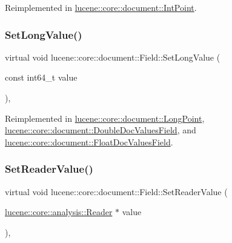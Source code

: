 Reimplemented in \mbox{\hyperlink{classlucene_1_1core_1_1document_1_1IntPoint_a49cd2286ec4ffa46d868eea812d85234}{lucene\+::core\+::document\+::\+Int\+Point}}.

\mbox{\label{classlucene_1_1core_1_1document_1_1Field_a949822599f392fb7fca20423902e535a}} 
\subsubsection{\texorpdfstring{Set\+Long\+Value()}{SetLongValue()}}
{\footnotesize\ttfamily virtual void lucene\+::core\+::document\+::\+Field\+::\+Set\+Long\+Value (\begin{DoxyParamCaption}\item[{const int64\+\_\+t}]{value }\end{DoxyParamCaption})\hspace{0.3cm}{\ttfamily [inline]}, {\ttfamily [virtual]}}



Reimplemented in \mbox{\hyperlink{classlucene_1_1core_1_1document_1_1LongPoint_a5bc668dfdf190b8bc0a52808a6580b40}{lucene\+::core\+::document\+::\+Long\+Point}}, \mbox{\hyperlink{classlucene_1_1core_1_1document_1_1DoubleDocValuesField_ab51b275ef2d23c248e945f4747a6dd6e}{lucene\+::core\+::document\+::\+Double\+Doc\+Values\+Field}}, and \mbox{\hyperlink{classlucene_1_1core_1_1document_1_1FloatDocValuesField_a27b6b009471cbaa1b0baf8facb97fa6d}{lucene\+::core\+::document\+::\+Float\+Doc\+Values\+Field}}.

\mbox{\label{classlucene_1_1core_1_1document_1_1Field_a86a255eb3b09b70fe76af3b7d75364e5}} 
\subsubsection{\texorpdfstring{Set\+Reader\+Value()}{SetReaderValue()}}
{\footnotesize\ttfamily virtual void lucene\+::core\+::document\+::\+Field\+::\+Set\+Reader\+Value (\begin{DoxyParamCaption}\item[{\mbox{\hyperlink{classlucene_1_1core_1_1analysis_1_1Reader}{lucene\+::core\+::analysis\+::\+Reader}} $\ast$}]{value }\end{DoxyParamCaption})\hspace{0.3cm}{\ttfamily [inline]}, {\ttfamily [virtual]}}

